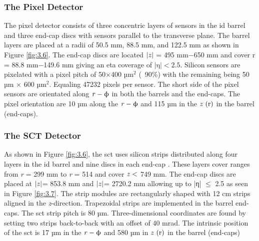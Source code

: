 \subsubsection{The Pixel Detector}
\par

The pixel detector consists of three concentric layers of sensors in the \gls{id} barrel and three end-cap discs with sensors
parallel to the transverse plane. The barrel layers are placed at a radii of 50.5 mm, 88.5 mm, and 122.5 mm as shown in Figure \ref{fig:3.6}.
The end-cap discs are located $|\textrm{\textit{z}}|$ = 495 mm$-$650 mm and cover r = 88.8 mm$-$149.6 mm giving an eta coverage 
of $|\textrm{η}| < \textrm{2.5}$. Silicon sensors are pixelated with a pixel pitch of 50$\times$400 µ$\textrm{m}^{\textrm{2}}$ (~90\%) with the remaining being 
50 µm $\times$ 600 µ$\textrm{m}^{\textrm{2}}$. Equaling 47232 pixels per sensor. The short side of the pixel sensors are orientated along $\textrm{\textit{r}}-\upphi$ in both the barrels and the end-caps.
The pixel orientation are 10 µm along the $\textrm{\textit{r}}-\upphi$ and 115 µm in the $\textrm{\textit{z}} \ (\textrm{r})$ in the barrel (end-caps).

\subsubsection{The SCT Detector}
\par
As shown in Figure \ref{fig:3.6}, the \gls{sct} uses silicon strips distributed along four layers in the \gls{id} barrel
and nine discs in each end-cap \cite{atlas}. These layers cover ranges from \textit{r} = 299 mm to \textit{r} = 514
and cover $\textrm{\textit{z}} <$ 749 mm. The end-cap discs are placed at $|\textrm{\textit{z}}|$= 853.8 mm and 
$|\textrm{\textit{z}}|$= 2720.2 mm allowing up to |η| $\le$ 2.5 as seen in Figure \ref{fig:3.7}. The strip modules are rectangularly shaped with 
12 cm strips aligned in the \textit{z}-direction. Trapezoidal strips are implemented in the barrel end-caps. The \gls{sct} strip pitch 
is 80 µm. Three-dimensional coordinates are found by setting two strips back-to-back with an offset of 40 mrad. The intrinsic position 
of the \gls{sct} is 17 µm in the $\textrm{\textit{r}}-\upphi$ and 580 µm in $\textrm{\textit{z}} \ (\textrm{r})$ in the barrel (end-caps)

